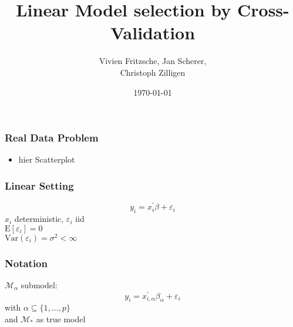 \documentclass[20pt,mathserif]{beamer}
\title[Cross Validation]{ Linear Model selection by Cross-Validation}
\author{ Vivien Fritzsche, Jan Scherer, \\ Christoph Zilligen}
\date{\today}
\newcommand{\E}{\mathrm{E}}
\newcommand{\Var}{\mathrm{Var}}
\begin{document}
\beamertemplatenavigationsymbolsempty
\begin{frame}
\titlepage
\thispagestyle{empty}
\end{frame}

\begin{frame}
\frametitle{Real Data Problem}
\begin{itemize}
	\item hier Scatterplot
\end{itemize}
\end{frame}

\begin{frame}
\frametitle{Linear Setting}
\[
	y_i=x_i^\prime\beta+\varepsilon_i
\]
$x_i$ deterministic, $\varepsilon_i$ iid \\\vspace*{5pt}
$\E[\varepsilon_i]=0$\\\vspace*{5pt}
$\Var(\varepsilon_i)=\sigma^2<\infty$
\end{frame}

\begin{frame}
\frametitle{Notation}
$\mathcal{M}_\alpha$ submodel:
\[
	y_i=x_{i,\alpha}^\prime\beta_\alpha+\varepsilon_i
\]
with $\alpha\subseteq\{1,\ldots,p\}$\\\vspace*{5pt}
and $\mathcal{M}_\ast$ as true model
\end{frame}
\end{document}
